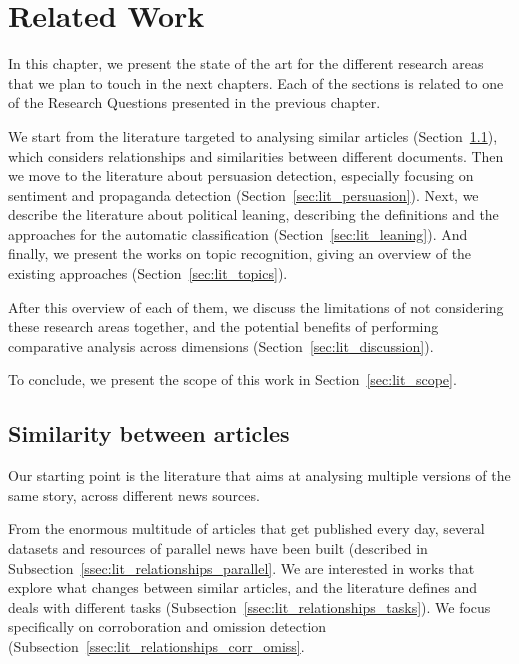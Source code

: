 \chapter{\statusorange Related Work}
\label{chap:literature}

In this chapter, we present the state of the art for the different research areas that we plan to touch in the next chapters. Each of the sections is related to one of the Research Questions presented in the previous chapter.

We start from the literature targeted to analysing similar articles (Section~\ref{sec:lit_relationships}), which considers relationships and similarities between different documents.
Then we move to the literature about persuasion detection, especially focusing on sentiment and propaganda detection (Section~\ref{sec:lit_persuasion}).
Next, we describe the literature about political leaning, describing the definitions and the approaches for the automatic classification (Section~\ref{sec:lit_leaning}).
And finally, we present the works on topic recognition, giving an overview of the existing approaches (Section~\ref{sec:lit_topics}).


After this overview of each of them, we discuss the limitations of not considering these research areas together, and the potential benefits of performing comparative analysis across dimensions (Section~\ref{sec:lit_discussion}).

To conclude, we present the scope of this work in Section~\ref{sec:lit_scope}.







\section{\statusgreen Similarity between articles}
\label{sec:lit_relationships}

Our starting point is the literature that aims at analysing multiple versions of the same story, across different news sources.

From the enormous multitude of articles that get published every day, several datasets and resources of parallel news have been built (described in Subsection~\ref{ssec:lit_relationships_parallel}.
We are interested in works that explore what changes between similar articles, and the literature defines and deals with different tasks (Subsection~\ref{ssec:lit_relationships_tasks}). We focus specifically on corroboration and omission detection (Subsection~\ref{ssec:lit_relationships_corr_omiss}.


